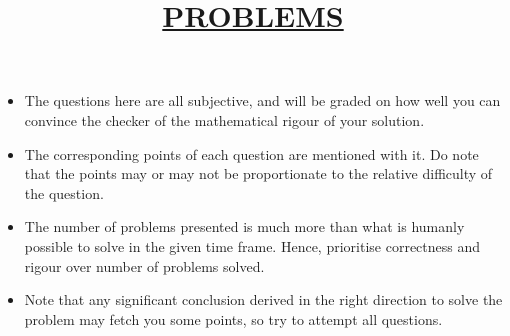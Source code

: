 \documentclass[12pt]{article}
\theoremstyle{definition}
\begin{document}
\newpage
\maketitle
\title{\begin{center}\textbf{\underline{\fontsize{18}{12}\selectfont PROBLEMS}}\end{center}}
\begin{itemize}
    \item The questions here are all subjective, and will be graded on how well you can convince the checker of the mathematical rigour of your solution.
    \item The corresponding points of each question are mentioned with it. Do note that the points may or may not be proportionate to the relative difficulty of the question.
    \item The number of problems presented is much more than what is humanly possible to solve in the given time frame. Hence, prioritise correctness and rigour over number of problems solved.
    \item Note that any significant conclusion derived in the right direction to solve the problem may fetch you some points, so try to attempt all questions.
\end{itemize}
\bigskip
\bigskip
\bigskip
\end{document}
